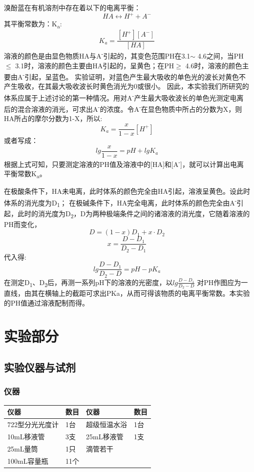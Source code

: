 \documentclass[11pt]{report}
\begin{document}
溴酚蓝在有机溶剂中存在着以下的电离平衡：
\[
   HA \longleftrightarrow H^{+} + A^{-}
   \]
其平衡常数为：K\textsubscript{a}:
\[
   K_{a}=\frac{[H^{+}][A^{-}]}{[HA]}
   \]
溶液的颜色是由显色物质HA与A\textsuperscript{-}引起的，其变色范围PH在3.1\(\sim\) 4.6之间，当PH\(\le\) 3.1时，溶液的颜色主要由HA引起的，呈黄色；在PH\(\ge\) 4.6时，溶液的颜色主要由A\textsuperscript{-}引起，呈蓝色。
实验证明，对蓝色产生最大吸收的单色光的波长对黄色不产生吸收，在其最大吸收波长时黄色消光为0或很小。
因此，本实验我们所研究的体系应属于上述讨论的第一种情况。用对A\textsuperscript{-}产生最大吸收波长的单色光测定电离后的混合溶液的消光，可求出A\textsuperscript{-}的浓度。令A\textsuperscript{-}在显色物质中所占的分数为X，则HA所占的摩尔分数为1-X，所以:
\[
   K_{a}=\frac{x}{1-x}[H^{+}]
   \]
或者写成：
\[
   lg\frac{x}{1-x}=pH+lg K_{a}
   \]
根据上式可知，只要测定溶液的PH值及溶液中的[HA]和[A\textsuperscript{-}]，就可以计算出电离平衡常数K\textsubscript{a}。

在极酸条件下，HA未电离，此时体系的颜色完全由HA引起，溶液呈黄色。设此时体系的消光度为D\textsubscript{1}；
在极碱条件下，HA完全电离，此时体系的颜色完全由A\textsuperscript{-}引起，此时的消光度为D\textsubscript{2}，D为两种极端条件之间的诸溶液的消光度，它随着溶液的PH而变化，
\[
   D=(1-x)D_{1}+x\cdot D_{2}
   \]
\[
   x=\frac{D-D_{1}}{D_{2}-D_{1}}
   \]
代入得:
\[
   lg\frac{D-D_{1}}{D_{2}-D}=pH - pK_{a}
   \]
在测定D\textsubscript{1}、D\textsubscript{2}后，再测一系列pH下的溶液的光密度，以\(lg\frac{D-D_{1}}{D_{2}-D}\) 对PH作图应为一直线，由其在横轴上的截距可求出PKa，从而可得该物质的电离平衡常数。本实验的PH值通过溶液配制而得。
\part{实验部分}
\label{sec:org9376fc7}
\chapter{实验仪器与试剂}
\label{sec:org34be1f8}
\section{仪器}
\label{sec:orga6320db}
\begin{center}
\begin{tabular}{llll}
仪器 & 数目 & 仪器 & 数目\\
\hline
722型分光光度计 & 1台 & 超级恒温水浴 & 1台\\
10mL移液管 & 3支 & 25mL移液管 & 1支\\
25mL量筒 & 1只 & 滴管若干 & \\
100mL容量瓶 & 11个 &  & \\
\end{tabular}
\end{center}
\end{document}
